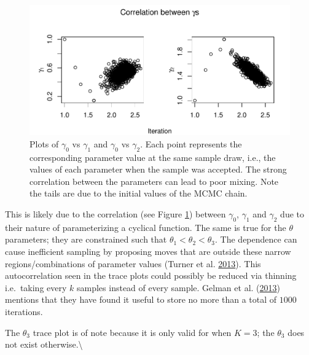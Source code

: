 \documentclass[11pt,a4paper]{article}
\numberwithin{equation}{section}
\begin{document}
\begin{figure}
\centering
\includegraphics{thesis_draft_files/figure-latex/unnamed-chunk-4-1.pdf}
\caption{\label{fig:cor_gammas}Plots of \(\gamma_0\) vs \(\gamma_1\) and
\(\gamma_0\) vs \(\gamma_2\). Each point represents the corresponding
parameter value at the same sample draw, i.e., the values of each
parameter when the sample was accepted. The strong correlation between
the parameters can lead to poor mixing. Note the tails are due to the
initial values of the MCMC chain.}
\end{figure}

This is likely due to the correlation (see Figure \ref{fig:cor_gammas})
between \(\gamma_0\), \(\gamma_1\) and \(\gamma_2\) due to their nature
of parameterizing a cyclical function. The same is true for the
\(\theta\) parameters; they are constrained such that
\(\theta_1 < \theta_2 < \theta_3\). The dependence can cause inefficient
sampling by proposing moves that are outside these narrow
regions/combinations of parameter values (Turner et al.
\protect\hyperlink{ref-turner_method_2013}{2013}). This autocorrelation
seen in the trace plots could possibly be reduced via thinning
i.e.~taking every \(k\) samples instead of every sample. Gelman et al.
(\protect\hyperlink{ref-gelman_bayesian_2013}{2013}) mentions that they
have found it useful to store no more than a total of \(1000\)
iterations.

The \(\theta_3\) trace plot is of note because it is only valid for when
\(K = 3\); the \(\theta_3\) does not exist otherwise.\textbackslash{}
\end{document}
